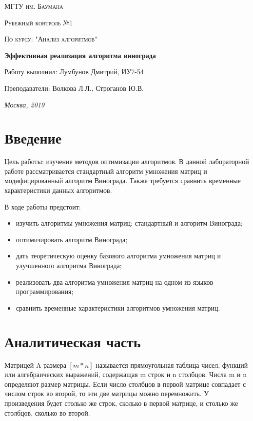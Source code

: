 \documentclass[12pt]{report}
\begin{document}
\begin{titlepage}
	\centering
	{\scshape\LARGE МГТУ им. Баумана \par}
	\vspace{3cm}
	{\scshape\Large Рубежный контроль №1\par}
	\vspace{0.5cm}	
	{\scshape\Large По курсу: "Анализ алгоритмов"\par}
	\vspace{1.5cm}
	{\huge\bfseries Эффективная реализация алгоритма винограда\par}
	\vspace{2cm}
	\Large Работу выполнил: Лумбунов Дмитрий, ИУ7-54\par
	\vspace{0.5cm}
	\Large Преподаватели:  Волкова Л.Л., Строганов Ю.В.\par

	\vfill
	\large \textit {Москва, 2019} \par
\end{titlepage}

\tableofcontents

\newpage
\chapter*{Введение}

Цель работы: изучение методов оптимизации алгоритмов. В данной лабораторной работе рассматривается стандартный алгоритм умножения матриц и модифицированный алгоритм Винограда.  Также требуется сравнить временные характеристики данных алгоритмов.

В ходе работы предстоит:
\begin{itemize}
	\item изучить алгоритмы умножения матриц: стандартный и алгоритм Винограда; 
	\item оптимизировать алгоритм Винограда; 
	\item дать теоретическую оценку базового алгоритма умножения матриц и улучшенного алгоритма Винограда;
	\item реализовать два алгоритма умножения матриц на одном из языков программирования;  
	\item сравнить временные характеристики алгоритмов умножения матриц.
\end{itemize}

\chapter{Аналитическая часть}
Матрицей A размера $[m*n]$ называется прямоугольная таблица
чисел, функций или алгебраических выражений, содержащая m строк и n столбцов. Числа m и n определяют размер матрицы.\cite{Beloysov} Если число столбцов в первой матрице совпадает с числом строк во второй, то эти две матрицы можно перемножить. У произведения будет столько же строк, сколько в первой матрице, и столько же столбцов, сколько во второй.
\end{document}
